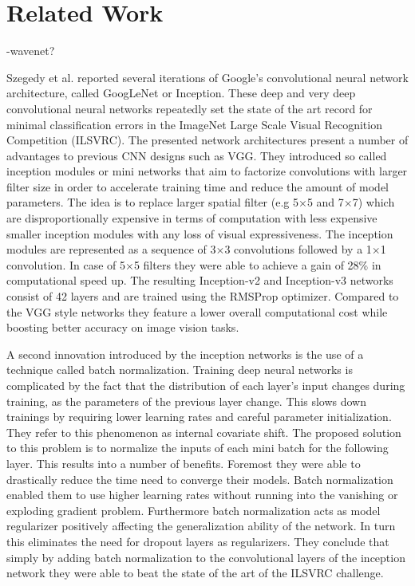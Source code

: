 \section{Related Work}
\label{sec:related_work}

-wavenet?

Szegedy et al. reported several iterations of Google's convolutional neural network architecture, called GoogLeNet or Inception\cite{szegedy2015going, szegedy2016rethinking, szegedy2016inception}. These deep and very deep convolutional neural networks repeatedly set the state of the art record for minimal classification errors in the ImageNet Large Scale Visual Recognition Competition (ILSVRC). The presented network architectures present a number of advantages to previous CNN designs such as VGG. They introduced so called inception modules or mini networks that aim to factorize convolutions with larger filter size in order to accelerate training time and reduce the amount of model parameters. The idea is to replace larger spatial filter (e.g 5$\times$5 and 7$\times$7) which are disproportionally expensive in terms of computation with less expensive smaller inception modules with any loss of visual expressiveness. The inception modules are represented as a sequence of 3$\times$3 convolutions followed by a 1$\times$1 convolution. In case of 5$\times$5 filters they were able to achieve a gain of 28\% in computational speed up. The resulting Inception-v2 and Inception-v3 networks consist of 42 layers and are trained using the RMSProp\cite{tieleman2012lecture} optimizer. Compared to the VGG style networks they feature a lower overall computational cost while boosting better accuracy on image vision tasks.

A second innovation introduced by the inception networks is the use of a technique called batch normalization\cite{ioffe2015batch}. Training deep neural networks is complicated by the fact that the distribution of each layer's input changes during training, as the parameters of the previous layer change. This slows down trainings by requiring lower learning rates and careful parameter initialization. They refer to this phenomenon as internal covariate shift. The proposed solution to this problem is to normalize the inputs of each mini batch for the following layer. This results into a number of benefits. Foremost they were able to drastically reduce the time need to converge their models. Batch normalization enabled them to use higher learning rates without running into the vanishing or exploding gradient problem. Furthermore batch normalization acts as model regularizer positively affecting the generalization ability of the network. In turn this eliminates the need for dropout layers as regularizers. They conclude that simply by adding batch normalization to the convolutional layers of the inception network they were able to beat the state of the art of the ILSVRC challenge.



